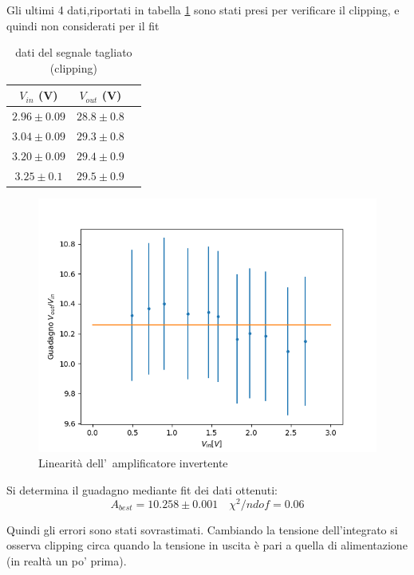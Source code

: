 \documentclass[10pt,a4paper]{article}
\begin{document}
		Gli ultimi 4 dati,riportati in tabella \ref{tab:daticlipping} sono stati presi per verificare il clipping, e quindi non considerati per il fit
		\begin{table}[h]
	
			\begin{center}
				\begin{tabular}{|c|c|c|}
					\hline
					$V_{in}$ (V) & $V_{out}$ (V)   \\
		\hline
		$2.96 \pm 0.09 $ & $28.8 \pm 0.8 $ \\
		\hline
		$3.04 \pm 0.09 $ & $29.3 \pm 0.8  $ \\
		\hline
		$3.20 \pm 0.09 $ & $29.4 \pm 0.9  $ \\
		\hline
		$3.25 \pm 0.1 $ & $29.5 \pm 0.9 $ \\
		\hline
		\end{tabular}
	\end{center}
\label{tab:daticlipping}
\caption{dati del segnale tagliato (clipping)}
\end{table}

	\begin{figure}\centering
			\includegraphics[scale=0.5]{fit.png}
				\caption{\small Linearit\`a dell'~amplificatore invertente}
			\label{fit}
	\end{figure}

	
	Si determina il guadagno mediante fit dei dati ottenuti:
	\[
	A_{best} = 10.258 \pm 0.001 \quad  \chi^2/ndof = 0.06
	\]

	Quindi gli errori sono stati sovrastimati.
	Cambiando la tensione dell'integrato si osserva clipping circa quando la tensione in uscita è pari a quella di alimentazione (in realtà un po' prima).
	
\end{document}
